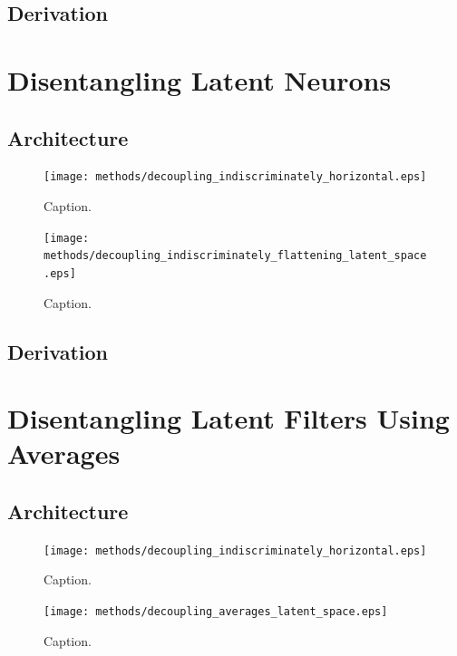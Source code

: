 \subsection{Derivation}

%
%
%
%
%
\section{Disentangling Latent Neurons}
\lipsum[2]
\subsection{Architecture}
\begin{figure}[H]
\centering
\captionsetup{justification=centering}
\texttt{[image: methods/decoupling\_indiscriminately\_horizontal.eps]}
\caption{Caption.}
\label{fig:decoupling_indiscriminately_horizontal}
\end{figure}

\begin{figure}[H]
\centering
\captionsetup{justification=centering}
\texttt{[image: methods/decoupling\_indiscriminately\_flattening\_latent\_space.eps]}
\caption{Caption.}
\label{fig:decoupling_indiscriminately_flattening_latent_space}
\end{figure}

\subsection{Derivation}



%
%
%
%
%
\section{Disentangling Latent Filters Using Averages}
\lipsum[2]
\subsection{Architecture}
\begin{figure}[H]
\centering
\captionsetup{justification=centering}
\texttt{[image: methods/decoupling\_indiscriminately\_horizontal.eps]}
\caption{Caption.}
\label{fig:decoupling_indiscriminately_horizontal}
\end{figure}

\begin{figure}[H]
\centering
\captionsetup{justification=centering}
\texttt{[image: methods/decoupling\_averages\_latent\_space.eps]}
\caption{Caption.}
\label{fig:decoupling_averages_latent_space}
\end{figure}

